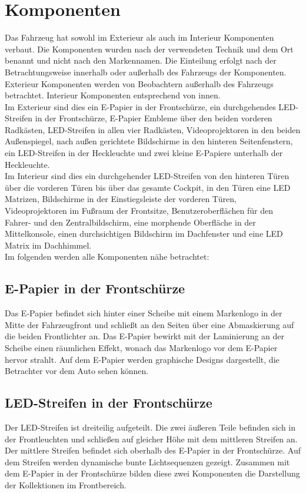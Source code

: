 \section{Komponenten}
Das Fahrzeug hat sowohl im Exterieur als auch im Interieur Komponenten verbaut. Die Komponenten wurden nach der verwendeten Technik und dem Ort benannt und nicht nach den Markennamen. Die Einteilung erfolgt nach der Betrachtungsweise innerhalb oder außerhalb des Fahrzeugs der Komponenten. Exterieur Komponenten werden von Beobachtern außerhalb des Fahrzeugs betrachtet. Interieur Komponenten entsprechend von innen.\\
Im Exterieur sind dies ein E-Papier in der Frontschürze, ein durchgehendes LED-Streifen in der Frontschürze, E-Papier Embleme über den beiden vorderen Radkästen, LED-Streifen in allen vier Radkästen, Videoprojektoren in den beiden Außenspiegel, nach außen gerichtete Bildschirme in den hinteren Seitenfenstern, ein LED-Streifen in der Heckleuchte und zwei kleine E-Papiere unterhalb der Heckleuchte.\\
Im Interieur sind dies ein durchgehender LED-Streifen von den hinteren Türen über die vorderen Türen bis über das gesamte Cockpit, in den Türen eine LED Matrizen, Bildschirme in der Einstiegsleiste der vorderen Türen, Videoprojektoren im Fußraum der Frontsitze, Benutzeroberflächen für den Fahrer- und den Zentralbildschirm, eine morphende Oberfläche in der Mittelkonsole, einen durchsichtigen Bildschirm im Dachfenster und eine LED Matrix im Dachhimmel.\\
Im folgenden werden alle Komponenten nähe betrachtet:
\subsection{E-Papier in der Frontschürze}
Das E-Papier befindet sich hinter einer Scheibe mit einem Markenlogo in der Mitte der Fahrzeugfront und schließt an den Seiten über eine Abmaskierung auf die beiden Frontlichter an. Das E-Papier bewirkt mit der Laminierung an der Scheibe einen räumlichen Effekt, wonach das Markenlogo vor dem E-Papier hervor strahlt.
Auf dem E-Papier werden graphische Designs dargestellt, die Betrachter vor dem Auto sehen können.
\subsection{LED-Streifen in der Frontschürze}
Der LED-Streifen ist dreiteilig aufgeteilt. Die zwei äußeren Teile befinden sich in der Frontleuchten und schließen auf gleicher Höhe mit dem mittleren Streifen an. Der mittlere Streifen befindet sich oberhalb des E-Papier in der Frontschürze.
Auf dem Streifen werden dynamische bunte Lichtsequenzen gezeigt.
Zusammen mit dem E-Papier in der Frontschürze bilden diese zwei Komponenten die Darstellung der Kollektionen im Frontbereich.
